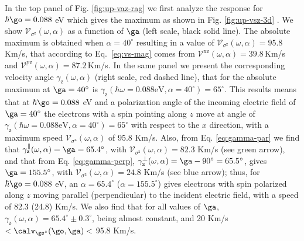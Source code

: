 \documentclass[prb,11pt,tightenlines,twocolumn,aps]{revtex4-1}
\begin{document}
In the top panel of Fig. \ref{fig:up-vaz-rag} we first analyze the
response for
$\hbar\go= 0.088$ eV which gives the maximum as shown
in Fig. \ref{fig:up-vsz-3d} . 
We show 
$\mathcal{V}_{\sigma^{\mathrm{z}}} (\omega,\alpha)$
as a function of $\ga$
(left scale, black solid line). 
The absolute maximum is obtained when
$\alpha = 40^{\circ}$ resulting in a value of
$\mathcal{V}_{\sigma^{\mathrm{z}}} (\omega,\alpha) = 95.8$\,Km/s, 
that according to Eq.~\eqref{eq:vs-mag} 
comes from 
$\mathcal{V}^{\mathrm{xz}}(\omega,\alpha)=39.8$\,Km/s and
$\mathcal{V}^{\mathrm{yz}}(\omega,\alpha)=87.2$\,Km/s.
% 
In the same panel we present the corresponding velocity angle
$\gamma_{\mathrm{z}}(\omega,\alpha)$ (right scale, red dashed line), that for
the absolute maximum at $\ga=40^\circ$ is
$\gamma_{\mathrm{z}}(\hbar\omega=0.088\text{eV},\alpha=40^\circ) = 65^{\circ}$. 
This results means that at $\hbar\go=0.088$ eV and a polarization
angle of the incoming 
electric field of $\ga=40^\circ$ 
the electrons with a spin pointing along $z$ move at angle of 
$\gamma_{\mathrm{z}}(\hbar\omega=0.088\text{eV},\alpha=40^\circ) =
65^{\circ}$
with respect to the $x$ direction,  
with a  maximum speed
$\mathcal{V}_{\sigma^{\mathrm{z}}} (\omega,\alpha)$ of  95.8 Km/s.
Also,
from Eq. \eqref{eq:gamma-par} we find that 
$\gamma^\parallel_{\mathrm{z}}(\omega,\alpha)=\ga=65.4^\circ$, with
$\mathcal{V}_{\sigma^{\mathrm{z}}}(\omega,\alpha) = 82.3$ Km/s 
(see green arrow),  
and 
that from Eq. \eqref{eq:gamma-perp}, 
$\gamma^\perp_{\mathrm{z}}(\omega,\alpha)=\ga-90^\circ=65.5^\circ$,
gives $\ga=155.5^\circ$, with  
$\mathcal{V}_{\sigma^{\mathrm{z}}}(\omega,\alpha) = 24.8$ Km/s
(see blue arrow); thus, for $\hbar\go=0.088$ eV, an
$\alpha=65.4^\circ$ ($\alpha=155.5^\circ$) gives 
electrons with spin polarized along $z$
moving 
parallel (perpendicular) to the
incident electric field,  with a speed of 82.3 (24.8) Km/s. 
% 
We also find that for all values of $\ga$,
$\gamma_{\mathrm{z}}(\omega,\alpha) =65.4^{\circ}\pm 0.3^{\circ}$,
being almost constant, and 20 Km/s $<\calv_{\gs^z}(\go,\ga)<$ 95.8 Km/s.
% 
\end{document}
